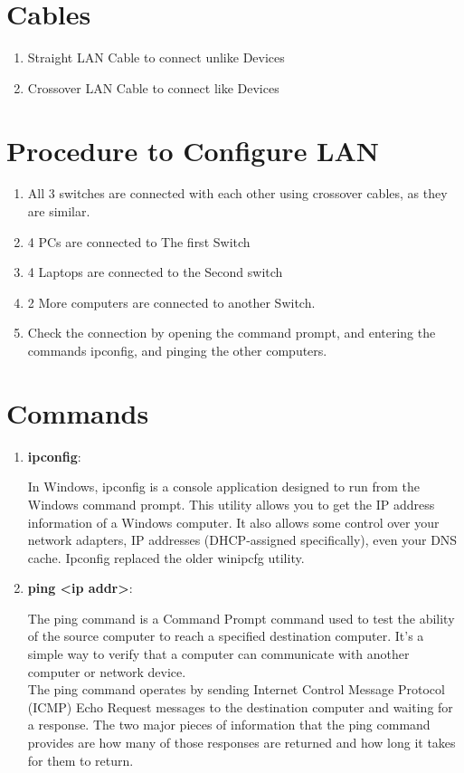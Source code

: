 \documentclass[11pt]{article}
\begin{document}
\section{Cables}
\begin{enumerate}
	\item Straight LAN Cable to connect unlike Devices
	\item Crossover LAN Cable to connect like Devices
\end{enumerate}

\section{Procedure to Configure LAN}
\begin{enumerate}
	\item All 3 switches are connected with each other using crossover cables, as they are similar. 
	\item 4 PCs are connected to The first Switch
    \item 4 Laptops are connected to the Second switch
    \item 2 More computers are connected to another Switch. 
    \item Check the connection by opening the command prompt, and entering the commands ipconfig, and pinging the other computers. 
\end{enumerate}

\section{Commands}

\begin{enumerate}
	\item \textbf{ipconfig}: 
	
	In Windows, ipconfig is a console application designed to run from the Windows command prompt. This utility allows you to get the IP address information of a Windows computer. It also allows some control over your network adapters, IP addresses (DHCP-assigned specifically), even your DNS cache. Ipconfig replaced the older winipcfg utility.
	\item \textbf{ping <ip addr>}: 
	
	The ping command is a Command Prompt command used to test the ability of the source computer to reach a specified destination computer. It's a simple way to verify that a computer can communicate with another computer or network device.\\ 
	The ping command operates by sending Internet Control Message Protocol (ICMP) Echo Request messages to the destination computer and waiting for a response. The two major pieces of information that the ping command provides are how many of those responses are returned and how long it takes for them to return.
\end{enumerate}
\end{document}
